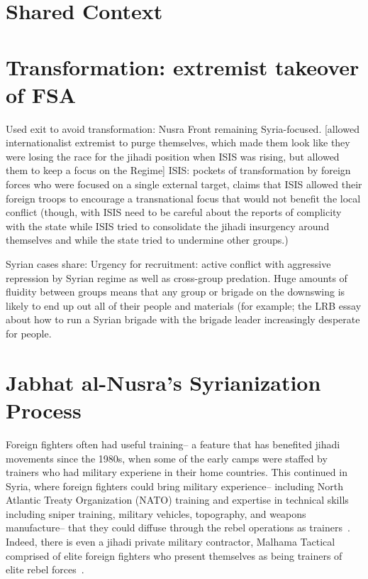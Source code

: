 \section{Shared Context}

\section{Transformation: extremist takeover of FSA}

Used exit to avoid transformation: Nusra Front remaining Syria-focused. [allowed internationalist extremist to purge themselves, which made them look like they were losing the race for the jihadi position when ISIS was rising, but allowed them to keep a focus on the Regime]
ISIS: pockets of transformation by foreign forces who were focused on a single external target, claims that ISIS allowed their foreign troops to encourage a transnational focus that would not benefit the local conflict (though, with ISIS need to be careful about the reports of complicity with the state while ISIS tried to consolidate the jihadi insurgency around themselves and while the state tried to undermine other groups.)


Syrian cases share:
Urgency for recruitment: active conflict with aggressive repression by Syrian regime as well as cross-group predation. Huge amounts of fluidity between groups means that any group or brigade on the downswing is likely to end up out all of their people and materials (for example; the LRB essay about how to run a Syrian brigade with the brigade leader increasingly desperate for people.

\section{Jabhat al-Nusra’s Syrianization Process}

Foreign fighters often had useful training-- a feature that has benefited jihadi movements since the 1980s, when some of the early camps were staffed by trainers who had military experiene in their home countries. This continued in Syria, where foreign fighters could bring military experience-- including North Atlantic Treaty Organization (NATO) training and expertise in technical skills including sniper training, military vehicles, topography, and weapons manufacture-- that they could diffuse through the rebel operations as  trainers~\autocite[136]{mironova}. Indeed, there is even a jihadi private military contractor, Malhama Tactical comprised of elite foreign fighters who present themselves as being trainers of elite rebel forces~\autocite{komar2017blackwater}. 

